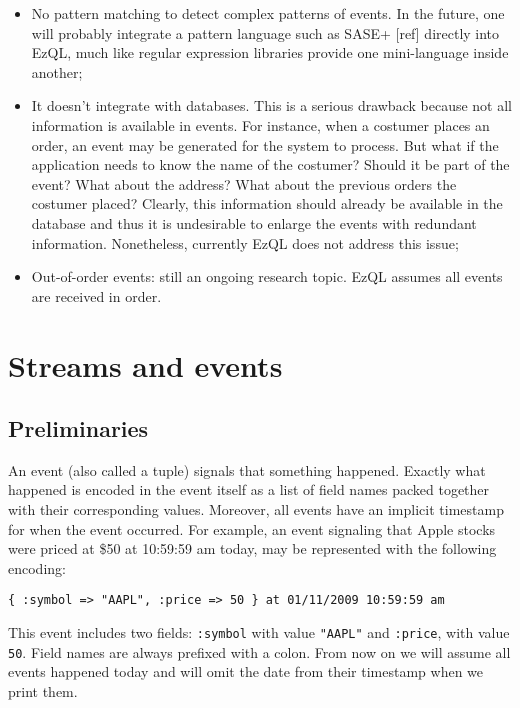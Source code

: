 \documentclass{report}
\begin{document}
\begin{itemize}
\item No pattern matching to detect complex patterns of events. In the
  future, one will probably integrate a pattern language such as SASE+
  [ref] directly into EzQL, much like regular expression libraries
  provide one mini-language inside another;
\item It doesn't integrate with databases. This is a serious drawback
  because not all information is available in events. For instance,
  when a costumer places an order, an event may be generated for the
  system to process. But what if the application needs to know the
  name of the costumer? Should it be part of the event? What about the
  address? What about the previous orders the costumer placed?
  Clearly, this information should already be available in the
  database and thus it is undesirable to enlarge the events with
  redundant information. Nonetheless, currently EzQL does not address
  this issue;
\item Out-of-order events: still an ongoing research topic. EzQL
  assumes all events are received in order.
\end{itemize}

\chapter{Streams and events}
\label{chap:streams-events}

\section{Preliminaries}

An event (also called a tuple) signals that something
happened. Exactly what happened is encoded in the event itself as a
list of field names packed together with their corresponding
values. Moreover, all events have an implicit times\-tamp for when the
event occurred. For example, an event signaling that Apple stocks were
priced at \$50 at 10:59:59 am today, may be represented with the
following encoding:

\begin{verbatim}
{ :symbol => "AAPL", :price => 50 } at 01/11/2009 10:59:59 am
\end{verbatim}

This event includes two fields: \verb=:symbol= with value
\verb="AAPL"= and \verb=:price=, with value \verb=50=. Field names are
always prefixed with a colon. From now on we will assume all events
happened today and will omit the date from their timestamp when we
print them.
\end{document}
